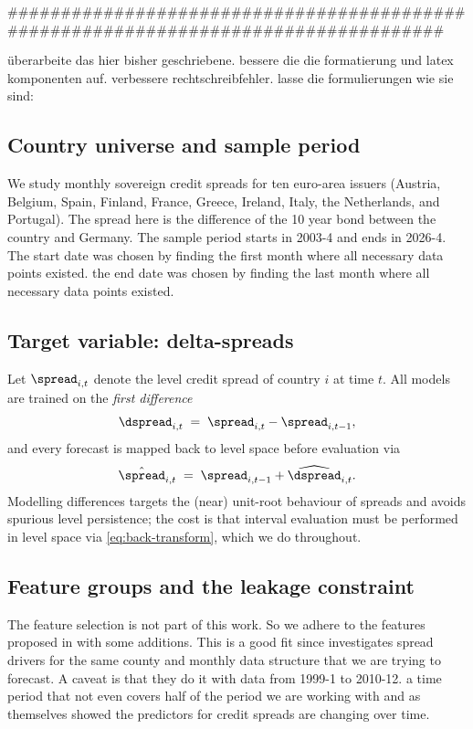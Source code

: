 
####################################################################################

überarbeite das hier bisher geschriebene. bessere die die formatierung und latex komponenten auf. verbessere rechtschreibfehler. lasse die formulierungen wie sie sind:
\subsection{Country universe and sample period}
\label{sec:data:universe}

We study monthly sovereign credit spreads for ten euro-area issuers
(Austria, Belgium, Spain, Finland, France, Greece, Ireland, Italy, the
Netherlands, and Portugal).
The spread here is the difference of the 10 year bond between the country and Germany. The sample period starts in 2003-4 and ends in 2026-4. The start date was chosen by finding the first month where all necessary data points existed. the end date was chosen by finding the last month where all necessary data points existed. 

\subsection{Target variable: delta-spreads}
\label{sec:data:target}

Let $\spread_{i,t}$ denote the level credit spread of country $i$ at time
$t$. All models are trained on the \emph{first difference}
\begin{equation}
  \dspread_{i,t} \;=\; \spread_{i,t} - \spread_{i,t-1},
  \label{eq:delta-target}
\end{equation}
and every forecast is mapped back to level space before evaluation via
\begin{equation}
  \hat{\spread}_{i,t} \;=\; \spread_{i,t-1} + \widehat{\dspread}_{i,t}.
  \label{eq:back-transform}
\end{equation}
Modelling differences targets the (near) unit-root behaviour of spreads and
avoids spurious level persistence; the cost is that interval evaluation must
be performed in level space via \cref{eq:back-transform}, which we do
throughout.

\subsection{Feature groups and the leakage constraint}
\label{sec:data:features}

The feature selection is not part of this work. So we adhere to the features proposed in 
\parencite[ECB WP 1781]{afonso2015} with some additions. This is a good fit since \parencite[ECB WP 1781]{afonso2015} investigates spread drivers for the same county and monthly data structure that we are trying to forecast. A caveat is that they do it with data from 1999-1 to 2010-12. a time period that not even covers half of the period we are working with and as \parencite[ECB WP 1781]{afonso2015} themselves showed the predictors for credit spreads are changing over time. \\

